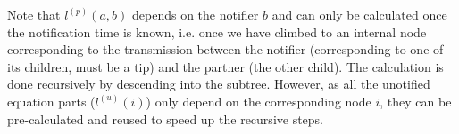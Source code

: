 \documentclass[a4paper,10pt]{article}
\begin{document}

Note that $l^{(p)}(a, b)$ depends on the notifier $b$ and can only be calculated once the notification time is known, i.e. once we have climbed to an internal node corresponding to the transmission between the notifier (corresponding to one of its children, must be a tip) and the partner (the other child). The calculation is done recursively by descending into the subtree. However, as all the unotified equation parts ($l^{(u)}(i)$) only depend on the corresponding node $i$, they can be pre-calculated and reused to speed up the recursive steps.
\end{document}
